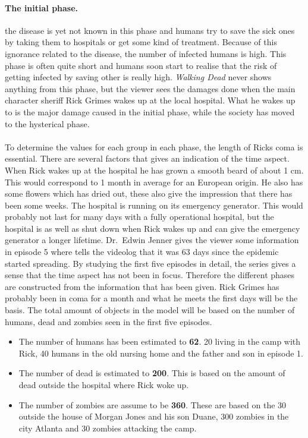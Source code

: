 \documentclass[%
twoside,                 %
final,                   %
10pt]{article}
\begin{document}
\paragraph{The initial phase.}
the disease is yet not known in this phase and humans try to save the sick ones by taking them to hospitals or get some kind of treatment. Because of this ignorance related to the disease, the number of infected humans is high. This phase is often quite short and humans soon start to realise that the risk of getting infected by saving other is really high. \emph{Walking Dead} never shows anything from this phase, but the viewer sees the damages done when the main character sheriff Rick Grimes wakes up at the local hospital. What he wakes up to is the major damage caused in the initial phase, while the society has moved to the hysterical phase.
\\
\\
To determine the values for each group in each phase, the length of Ricks coma is essential. There are several factors that gives an indication of the time aspect. When Rick wakes up at the hospital he has grown a smooth beard of about 1 cm. This would correspond to 1 month in average for an European origin. He also has some flowers which has dried out, these also give the impression that there has been some weeks. The hospital is running on its emergency generator. This would probably not last for many days with a fully operational hospital, but the hospital is as well as shut down when Rick wakes up and can give the emergency generator a longer lifetime. Dr.~Edwin Jenner gives the viewer some information in episode 5 where tells the videolog that it was 63 days since the epidemic started spreading. By studying the first five episodes in detail, the series gives a sense that the time aspect has not been in focus. Therefore the different phases are constructed from the information that has been given. Rick Grimes has probably been in coma for a month and what he meets the first days will be the basis. The total amount of objects in the model will be based on the number of humans, dead and zombies seen in the first five episodes. 
\begin{itemize}
 \item The number of humans has been estimated to \textbf{62}. 20 living in the camp with Rick, 40 humans in the old nursing home and the father and son in episode 1. 

 \item The number of dead is estimated to \textbf{200}. This is based on the amount of dead outside the hospital where Rick woke up. 

 \item The number of zombies are assume to be \textbf{360}. These are based on the 30 outside the house of Morgan Jones and his son Duane, 300 zombies in the city Atlanta and 30 zombies attacking the camp. 
\end{itemize}
\end{document}
